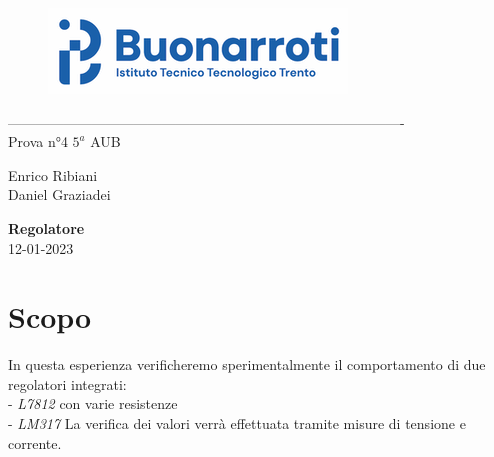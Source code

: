 \documentclass[12pt]{article}
\begin{document}
    \begin{titlepage}
    \begin{center}
\begin{figure}
    \centering
    \includegraphics[scale=1.5]{Logo.png}
    \label{fig:logo}
\end{figure}
-------------------------------------------------------------------------------------\\
\vspace{2\baselineskip}
\large Prova n°4
\hfill
\large $5^a$   AUB\\
\begin{flushleft}
    \large Enrico Ribiani\\
    \large Daniel Graziadei\\
\end{flushleft}


\vfill

\Huge{\textbf{Regolatore}}\\
\vfill
\vfill
\large{12-01-2023}
\end{center}
\end{titlepage}
\tableofcontents
\newpage
\vskip 1cm
\section{Scopo}
In questa esperienza verificheremo sperimentalmente il comportamento di due regolatori integrati:\\
- \textit{L7812} con varie resistenze\\
- \textit{LM317}
La verifica dei valori verrà effettuata tramite misure di tensione e corrente.\\
\noindent
\end{document}

